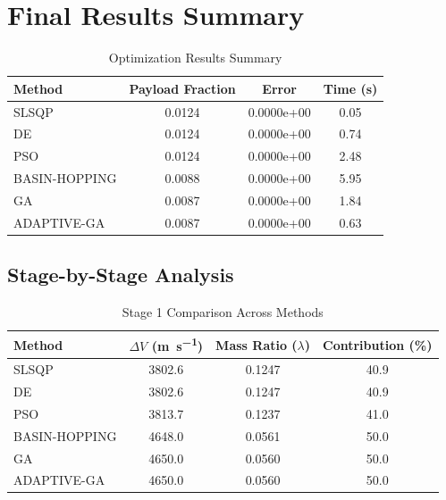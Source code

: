 \documentclass{article}
\begin{document}
\section{Final Results Summary}
\begin{table}[H]
\centering
\caption{Optimization Results Summary}
\begin{tabular}{lS[table-format=1.4]S[table-format=1.4e-1]S[table-format=1.2]}
\toprule
Method & {Payload Fraction} & {Error} & {Time (\si{\second})} \\
\midrule
SLSQP        & 0.0124 & 0.0000e+00 & 0.05 \\
DE           & 0.0124 & 0.0000e+00 & 0.74 \\
PSO          & 0.0124 & 0.0000e+00 & 2.48 \\
BASIN-HOPPING & 0.0088 & 0.0000e+00 & 5.95 \\
GA           & 0.0087 & 0.0000e+00 & 1.84 \\
ADAPTIVE-GA  & 0.0087 & 0.0000e+00 & 0.63 \\
\bottomrule
\end{tabular}
\end{table}

\subsection{Stage-by-Stage Analysis}


\begin{table}[H]
\centering
\caption{Stage 1 Comparison Across Methods}
\begin{tabular}{lS[table-format=4.1]S[table-format=1.4]S[table-format=3.1]}
\toprule
Method & {$\Delta V$ (\si{\meter\per\second})} & {Mass Ratio ($\lambda$)} & {Contribution (\%)} \\
\midrule
SLSQP        & 3802.6 & 0.1247 & 40.9 \\
DE           & 3802.6 & 0.1247 & 40.9 \\
PSO          & 3813.7 & 0.1237 & 41.0 \\
BASIN-HOPPING & 4648.0 & 0.0561 & 50.0 \\
GA           & 4650.0 & 0.0560 & 50.0 \\
ADAPTIVE-GA  & 4650.0 & 0.0560 & 50.0 \\
\bottomrule
\end{tabular}
\end{table}
\end{document}
